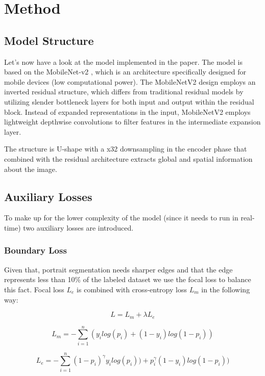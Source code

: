 \section{Method}
\subsection{Model Structure}
Let's now have a look at the model implemented in the paper. The model is based on the MobileNet-v2 \cite{DBLP:journals/corr/abs-1801-04381}, which is an architecture specifically designed for mobile devices (low computational power). The MobileNetV2 design employs an inverted residual structure, which differs from traditional residual models by utilizing slender bottleneck layers for both input and output within the residual block. Instead of expanded representations in the input, MobileNetV2 employs lightweight depthwise convolutions to filter features in the intermediate expansion layer. 

The structure is U-shape with a x32 downsampling in the encoder phase that combined with the residual architecture extracts global and spatial information about the image.


\subsection{Auxiliary Losses}
To make up for the lower complexity of the model (since it needs to run in real-time) two auxiliary losses are introduced.

\subsubsection{Boundary Loss}
Given that, portrait segmentation needs sharper edges and that the edge represents less than 10\% of the labeled dataset we use the focal loss to balance this fact. Focal loss $L_e$ is combined with cross-entropy loss $L_m$ in the following way:

\begin{equation}
    L=L_m + \lambda L_e
\end{equation}

\begin{equation}
    L_m = - \sum_{i=1}^{n}(y_ilog(p_i)+(1-y_i)log(1-p_i))
\end{equation}

\begin{equation}
    L_e = - \sum_{i=1}^{n}(1-p_i)^\gamma y_ilog(p_i)) + p_i^{\gamma}(1-y_i)log(1-p_i))
\end{equation}

